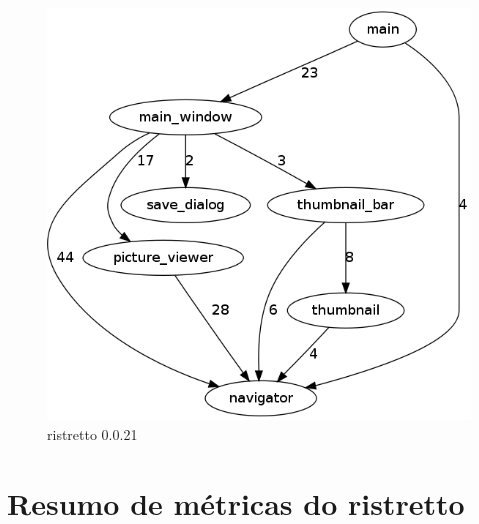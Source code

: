 \begin{figure}[h]
\center
\includegraphics[scale=0.4]{imagens/ristretto-0_0_21-doxyparse-2}
\caption{ristretto 0.0.21}
\label{fig:ristretto-0.0.21-doxyparse-2-anexo}
\end{figure}

\chapter{Resumo de métricas do ristretto} \label{ch:resumo-comparativo}

